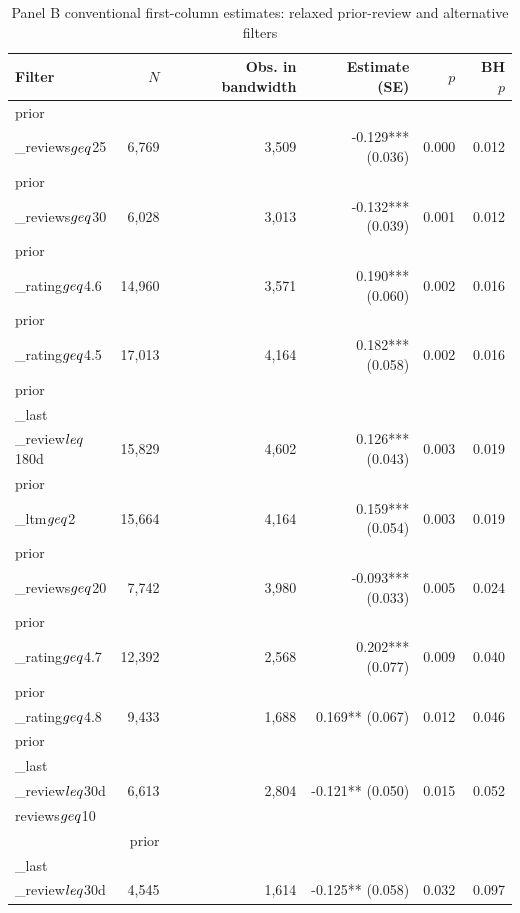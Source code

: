 \begin{table}[!htbp]
\centering
\caption{Panel B conventional first-column estimates: relaxed prior-review and alternative filters}
\label{tab:panel_b_trim00_filter_comparison}
\small
\begin{tabular}{lrrrrr}
\toprule
Filter & $N$ & Obs. in bandwidth & Estimate (SE) & $p$ & BH $p$ \\
\midrule
prior\\_reviews$\\geq$25 & 6,769 & 3,509 & -0.129*** (0.036) & 0.000 & 0.012 \\
prior\\_reviews$\\geq$30 & 6,028 & 3,013 & -0.132*** (0.039) & 0.001 & 0.012 \\
prior\\_rating$\\geq$4.6 & 14,960 & 3,571 & 0.190*** (0.060) & 0.002 & 0.016 \\
prior\\_rating$\\geq$4.5 & 17,013 & 4,164 & 0.182*** (0.058) & 0.002 & 0.016 \\
prior\\_last\\_review$\\leq$180d & 15,829 & 4,602 & 0.126*** (0.043) & 0.003 & 0.019 \\
prior\\_ltm$\\geq$2 & 15,664 & 4,164 & 0.159*** (0.054) & 0.003 & 0.019 \\
prior\\_reviews$\\geq$20 & 7,742 & 3,980 & -0.093*** (0.033) & 0.005 & 0.024 \\
prior\\_rating$\\geq$4.7 & 12,392 & 2,568 & 0.202*** (0.077) & 0.009 & 0.040 \\
prior\\_rating$\\geq$4.8 & 9,433 & 1,688 & 0.169** (0.067) & 0.012 & 0.046 \\
prior\\_last\\_review$\\leq$30d & 6,613 & 2,804 & -0.121** (0.050) & 0.015 & 0.052 \\
reviews$\\geq$10 \\& prior\\_last\\_review$\\leq$30d & 4,545 & 1,614 & -0.125** (0.058) & 0.032 & 0.097 \\

\end{tabular}
\end{table}

